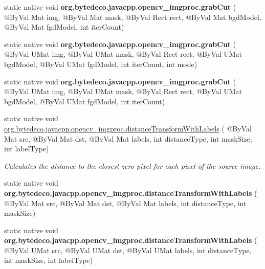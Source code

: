 \begin{DoxyCompactItemize}
static native void {\bfseries org.\+bytedeco.\+javacpp.\+opencv\+\_\+imgproc.\+grab\+Cut} ( @By\+Val Mat img, @By\+Val Mat mask, @By\+Val Rect rect, @By\+Val Mat bgd\+Model, @By\+Val Mat fgd\+Model, int iter\+Count)
\item 
\mbox{\label{group__imgproc__misc_gab041eb7310c1d4f0d3ce2e7f2250c489}} 
static native void {\bfseries org.\+bytedeco.\+javacpp.\+opencv\+\_\+imgproc.\+grab\+Cut} ( @By\+Val U\+Mat img, @By\+Val U\+Mat mask, @By\+Val Rect rect, @By\+Val U\+Mat bgd\+Model, @By\+Val U\+Mat fgd\+Model, int iter\+Count, int mode)
\item 
\mbox{\label{group__imgproc__misc_gaab75a44bc618967aac53a0cb9edc9afd}} 
static native void {\bfseries org.\+bytedeco.\+javacpp.\+opencv\+\_\+imgproc.\+grab\+Cut} ( @By\+Val U\+Mat img, @By\+Val U\+Mat mask, @By\+Val Rect rect, @By\+Val U\+Mat bgd\+Model, @By\+Val U\+Mat fgd\+Model, int iter\+Count)
\item 
static native void \hyperlink{group__imgproc__misc_gaaaf8e9c28cfa3aa0fba026897d9ad6d8}{org.\+bytedeco.\+javacpp.\+opencv\+\_\+imgproc.\+distance\+Transform\+With\+Labels} ( @By\+Val Mat src, @By\+Val Mat dst, @By\+Val Mat labels, int distance\+Type, int mask\+Size, int label\+Type)
\begin{DoxyCompactList}\small\item\em Calculates the distance to the closest zero pixel for each pixel of the source image. \end{DoxyCompactList}\item 
\mbox{\label{group__imgproc__misc_gab10abe49dd9e7c89f5ce0119e86d2e5d}} 
static native void {\bfseries org.\+bytedeco.\+javacpp.\+opencv\+\_\+imgproc.\+distance\+Transform\+With\+Labels} ( @By\+Val Mat src, @By\+Val Mat dst, @By\+Val Mat labels, int distance\+Type, int mask\+Size)
\item 
\mbox{\label{group__imgproc__misc_gaa5ea0ac3fba988e5c3cb4812ad044cda}} 
static native void {\bfseries org.\+bytedeco.\+javacpp.\+opencv\+\_\+imgproc.\+distance\+Transform\+With\+Labels} ( @By\+Val U\+Mat src, @By\+Val U\+Mat dst, @By\+Val U\+Mat labels, int distance\+Type, int mask\+Size, int label\+Type)
\item 
\mbox{\label{group__imgproc__misc_gacb591056018fcb51f0dc3e0126df9df4}} 

\end{DoxyCompactItemize}

